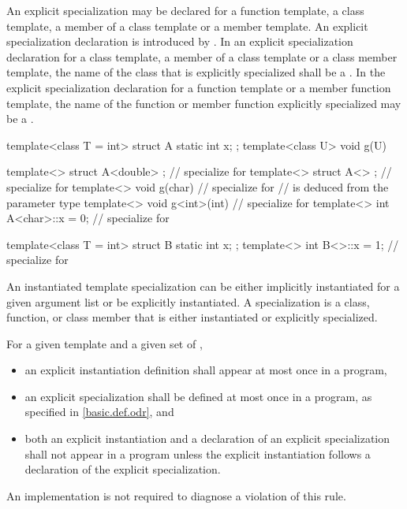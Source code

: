 \pnum
An explicit specialization may be declared for a function template,
a class template, a member of a class template or a member template.
An explicit specialization declaration is introduced by
.
In an explicit specialization declaration for a class template,
a member of a class template or a class member template,
the name of the class that is explicitly specialized shall be a
.
In the explicit specialization declaration for a function template or
a member function template,
the name of the function or member function explicitly specialized may be a
.
\begin{example}

\begin{codeblock}
template<class T = int> struct A {
  static int x;
};
template<class U> void g(U) { }

template<> struct A<double> { };        // specialize for 
template<> struct A<> { };              // specialize for 
template<> void g(char) { }             // specialize for 
                                        //  is deduced from the parameter type
template<> void g<int>(int) { }         // specialize for 
template<> int A<char>::x = 0;          // specialize for 

template<class T = int> struct B {
  static int x;
};
template<> int B<>::x = 1;              // specialize for 
\end{codeblock}
\end{example}

\pnum
An instantiated template specialization can be either implicitly
instantiated for a given argument list or be explicitly
instantiated.
A specialization is a class, function, or class member that is either
instantiated or explicitly specialized.

\pnum
For a given template and a given set of
,
\begin{itemize}
\item
an explicit instantiation definition shall appear at most once in a program,
\item
an explicit specialization shall be defined at most once
in a program, as specified in \ref{basic.def.odr}, and
\item
both an explicit instantiation and a declaration of an
explicit specialization shall not appear in a program unless
the explicit instantiation follows a declaration of the explicit
specialization.
\end{itemize}
An implementation is not required to diagnose a violation of this rule.

